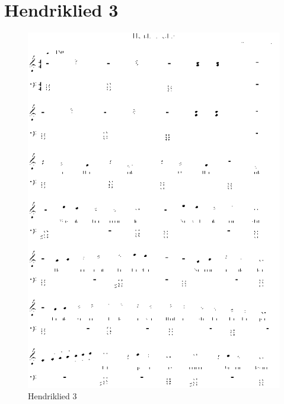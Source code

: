 \section{Hendriklied 3}



\begin{figure}[!htbp]
  \includegraphics[width=\textwidth,height=\textheight,keepaspectratio]{../songs/13_hendriklied_3_1.png}
  \caption{Hendriklied 3}
  \label{fig:13_hendriklied_3}
\end{figure}

